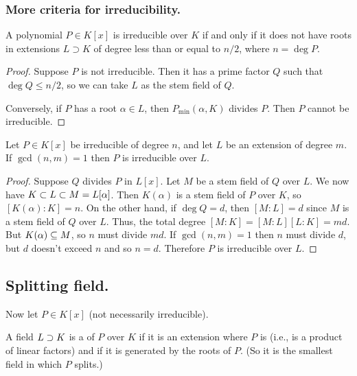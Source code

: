 \subsubsection{More criteria for irreducibility.}
\begin{cor}
A polynomial $P \in K[x]$ is irreducible over $K$ if and only if it does not have roots in extensions $L \supset K$ of degree less than or equal to $n / 2$, where $n = \deg P$.
\end{cor}
\begin{proof}
Suppose $P$ is not irreducible. Then it has a prime factor $Q$ such that $\deg Q \leq n/2$, so we can take $L$ as the stem field of $Q$.

Conversely, if $P$ has a root $\alpha \in L$, then $P_{\min}(\alpha, K)$ divides $P$. Then $P$ cannot be irreducible.
\end{proof}

\begin{cor}
Let $P \in K[x]$ be irreducible of degree $n$, and let $L$ be an extension of degree $m$. If $\gcd(n, m) = 1$ then $P$ is irreducible over $L$.
\end{cor}
\begin{proof}
Suppose $Q$ divides $P$ in $L[x]$. Let $M$ be a stem field of $Q$ over $L$. We now have $K \subset L \subset M = L[\alpha]$. Then $K(\alpha)$ is a stem field of $P$ over $K$, so $[K(\alpha):K] = n$. On the other hand, if $\deg Q = d$, then $[M:L] = d$ since $M$ is a stem field of $Q$ over $L$. Thus, the total degree $[M:K] = [M:L][L:K] = m d$. But $K(\alpha) \subseteq M$, so $n$ must divide $md$. If $\gcd(n,m) = 1$ then $n$ must divide $d$, but $d$ doesn't exceed $n$ and so $n = d$. Therefore $P$ is irreducible over $L$.
\end{proof}

\subsection{Splitting field.}
Now let $P \in K[x]$ (not necessarily irreducible).

\begin{dfn}
A field $L \supset K$ is a  of $P$ over $K$ if it is an extension where $P$ is  (i.e., is a product of linear factors) and if it is generated by the roots of $P$. (So it is the smallest field in which $P$ splits.)
\end{dfn}

